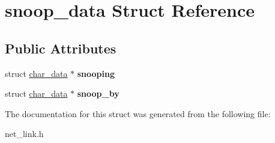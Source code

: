 \hypertarget{structsnoop__data}{\section{snoop\-\_\-data Struct Reference}
\label{structsnoop__data}
}
\subsection*{Public Attributes}
\begin{DoxyCompactItemize}
\item 
\hypertarget{structsnoop__data_aeb670134f44fa1a13c78a066b1794853}{struct \hyperlink{structchar__data}{char\-\_\-data} $\ast$ {\bfseries snooping}}\label{structsnoop__data_aeb670134f44fa1a13c78a066b1794853}

\item 
\hypertarget{structsnoop__data_a0cf73d853af690ef419aa79a10571e29}{struct \hyperlink{structchar__data}{char\-\_\-data} $\ast$ {\bfseries snoop\-\_\-by}}\label{structsnoop__data_a0cf73d853af690ef419aa79a10571e29}

\end{DoxyCompactItemize}


The documentation for this struct was generated from the following file\-:\begin{DoxyCompactItemize}
\item 
net\-\_\-link.\-h\end{DoxyCompactItemize}
